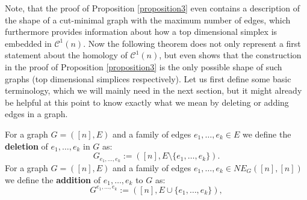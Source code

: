 Note, that the proof of Proposition \ref{proposition3} even contains a description of the shape of a cut-minimal graph with the maximum number of edges, which furthermore provides information about how a top dimensional simplex is embedded in \(\mathcal{C}^1(n)\). Now the following theorem does not only represent a first statement about the homology of \(\mathcal{C}^1(n)\), but even shows that the construction in the proof of Proposition \ref{proposition3} is the only possible shape of such graphs (top dimensional simplices respectively). Let us first define some basic terminology, which we will mainly need in the next section, but it might already be helpful at this point to know exactly what we mean by deleting or adding edges in a graph.
\begin{defi}
For a graph \(G=([n],E)\) and a family of edges \(e_1,\ldots,e_k\in E\) we define the \textbf{deletion} of \(e_1,\ldots,e_k\) in \(G\) as:
\[
G_{e_1,\ldots,e_k}:=([n],E\setminus\{e_1,\ldots,e_k\}).
\]
For a graph \(G=([n],E)\) and a family of edges \(e_1,\ldots,e_k\in NE_G([n],[n])\) we define the \textbf{addition} of \(e_1,\ldots,e_k\) to \(G\) as:
\[
G^{e_1,\ldots,e_k}:=([n],E\cup\{e_1,\ldots,e_k\}),
\]
\end{defi}
